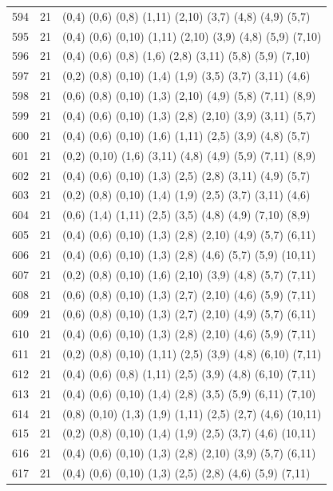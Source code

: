 {\begin{longtable}{lll}
594 & 21 & (0,4) (0,6) (0,8) (1,11) (2,10) (3,7) (4,8) (4,9) (5,7) \\
595 & 21 & (0,4) (0,6) (0,10) (1,11) (2,10) (3,9) (4,8) (5,9) (7,10) \\
596 & 21 & (0,4) (0,6) (0,8) (1,6) (2,8) (3,11) (5,8) (5,9) (7,10) \\
597 & 21 & (0,2) (0,8) (0,10) (1,4) (1,9) (3,5) (3,7) (3,11) (4,6) \\
598 & 21 & (0,6) (0,8) (0,10) (1,3) (2,10) (4,9) (5,8) (7,11) (8,9) \\
599 & 21 & (0,4) (0,6) (0,10) (1,3) (2,8) (2,10) (3,9) (3,11) (5,7) \\
600 & 21 & (0,4) (0,6) (0,10) (1,6) (1,11) (2,5) (3,9) (4,8) (5,7) \\
601 & 21 & (0,2) (0,10) (1,6) (3,11) (4,8) (4,9) (5,9) (7,11) (8,9) \\
602 & 21 & (0,4) (0,6) (0,10) (1,3) (2,5) (2,8) (3,11) (4,9) (5,7) \\
603 & 21 & (0,2) (0,8) (0,10) (1,4) (1,9) (2,5) (3,7) (3,11) (4,6) \\
604 & 21 & (0,6) (1,4) (1,11) (2,5) (3,5) (4,8) (4,9) (7,10) (8,9) \\
605 & 21 & (0,4) (0,6) (0,10) (1,3) (2,8) (2,10) (4,9) (5,7) (6,11) \\
606 & 21 & (0,4) (0,6) (0,10) (1,3) (2,8) (4,6) (5,7) (5,9) (10,11) \\
607 & 21 & (0,2) (0,8) (0,10) (1,6) (2,10) (3,9) (4,8) (5,7) (7,11) \\
608 & 21 & (0,6) (0,8) (0,10) (1,3) (2,7) (2,10) (4,6) (5,9) (7,11) \\
609 & 21 & (0,6) (0,8) (0,10) (1,3) (2,7) (2,10) (4,9) (5,7) (6,11) \\
610 & 21 & (0,4) (0,6) (0,10) (1,3) (2,8) (2,10) (4,6) (5,9) (7,11) \\
611 & 21 & (0,2) (0,8) (0,10) (1,11) (2,5) (3,9) (4,8) (6,10) (7,11) \\
612 & 21 & (0,4) (0,6) (0,8) (1,11) (2,5) (3,9) (4,8) (6,10) (7,11) \\
613 & 21 & (0,4) (0,6) (0,10) (1,4) (2,8) (3,5) (5,9) (6,11) (7,10) \\
614 & 21 & (0,8) (0,10) (1,3) (1,9) (1,11) (2,5) (2,7) (4,6) (10,11) \\
615 & 21 & (0,2) (0,8) (0,10) (1,4) (1,9) (2,5) (3,7) (4,6) (10,11) \\
616 & 21 & (0,4) (0,6) (0,10) (1,3) (2,8) (2,10) (3,9) (5,7) (6,11) \\
617 & 21 & (0,4) (0,6) (0,10) (1,3) (2,5) (2,8) (4,6) (5,9) (7,11) \\

\end{longtable}}
